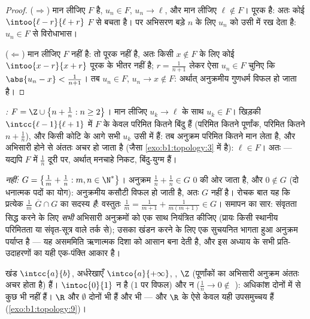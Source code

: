 \begin{proof}
($\Rightarrow$) मान लीजिए $F$  है, $u_n \in F$, $u_n \to \ell$, और मान
लीजिए $\ell \notin F$। पूरक  है: अतः कोई $\intoo{\ell - r}{\ell + r}$
$F$ से बचता है। पर अभिसरण बड़े $n$ के लिए $u_n$ को उसी  में रख देता
है: $u_n \in F$ से विरोधाभास।

($\Leftarrow$) मान लीजिए $F$  नहीं है: तो पूरक  नहीं है, अतः किसी
$x \notin F$ के लिए कोई  $\intoo{x - r}{x + r}$ पूरक के भीतर नहीं है;
$r = \frac{1}{n+1}$ लेकर ऐसा $u_n \in F$ चुनिए कि $\abs{u_n - x} <
\frac{1}{n+1}$। तब $u_n \in F$, $u_n \to x \notin F$: अर्थात् अनुक्रमीय
गुणधर्म विफल हो जाता है।
\end{proof}

\begin{example}[अनुक्रमीय कसौटी, दोनों ओर]\label{ex:b1:topology:seqtest}
\emph{:} $F = \Z \cup \bigl\{n + \frac1n : n \geq 2\bigr\}$। मान लीजिए
$u_k \to \ell$ के साथ $u_k \in F$। खिड़की $\intcc{\ell - 1}{\ell + 1}$ में
$F$ के केवल परिमित कितने बिंदु हैं (परिमित कितने पूर्णांक, परिमित कितने $n +
\frac1n$), और किसी कोटि के आगे सभी $u_k$ उसी में हैं: तब अनुक्रम परिमित
कितने मान लेता है, और अभिसारी होने से अंततः अचर हो जाता है (जैसा
\cref{exo:b1:topology:3} में है): $\ell \in F$। अतः  --- यद्यपि $F$ में
$\frac1n$ दूरी पर, अर्थात् मनचाहे निकट, बिंदु-युग्म हैं।

\emph{ नहीं:} $G = \bigl\{\frac1m + \frac1n : m, n \in \N^*\bigr\}$।
अनुक्रम $\frac1n + \frac1n \in G$ $0$ की ओर जाता है, और $0 \notin G$ (दो
धनात्मक पदों का योग): अनुक्रमीय कसौटी विफल हो जाती है, अतः $G$  नहीं
है। रोचक बात यह कि प्रत्येक $\frac1m$ $\overline G \cap G$ का सदस्य
\emph{है}: वस्तुतः $\frac1m = \frac{1}{m+1} + \frac{1}{m(m+1)} \in G$। समापन
का सार: संवृतता सिद्ध करने के लिए \emph{सभी} अभिसारी अनुक्रमों को एक साथ
नियंत्रित कीजिए (प्रायः किसी स्थानीय परिमितता या संवृत-सूत्र वाले तर्क से);
उसका खंडन करने के लिए एक सुचयनित भागता हुआ अनुक्रम पर्याप्त है --- यह
असममिति ऋणात्मक दिशा को आसान बना देती है, और इस अध्याय के सभी प्रति-उदाहरणों
का यही एक-पंक्ति आकार है।
\end{example}

\begin{example}\label{ex:b1:topology:closed}
खंड $\intcc{a}{b}$, अर्धरेखाएँ $\intco{a}{+\infty}$, , $\Z$
(पूर्णांकों का अभिसारी अनुक्रम अंततः अचर होता है)  हैं। $\intoc{0}{1}$
न  है ($1$ पर विफल) और न  ($\frac 1n \to 0 \notin$ ):
अधिकांश  दोनों में से कुछ भी नहीं हैं। $\R$ और $\emptyset$ दोनों
 भी हैं और  भी --- और $\R$ के ऐसे केवल यही उपसमुच्चय हैं
(\cref{exo:b1:topology:9})।
\end{example}


